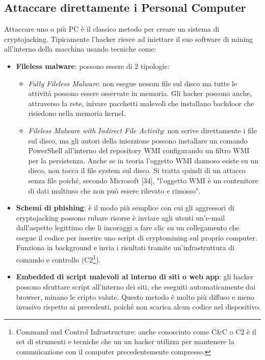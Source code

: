 \documentclass[12pt,a4paper]{article}
\begin{document}
\subsection{Attaccare direttamente i Personal Computer}
Attaccare uno o più PC è il classico metodo per creare un sistema di
cryptojacking. Tipicamente l'hacker riesce ad iniettare il suo software di
mining all'interno della macchina usando tecniche come:
\begin{itemize}
    \item \textbf{Fileless malware}: possono essere di 2 tipologie:
    \begin{itemize}
        \item \textit{Fully Fileless Malware}: non esegue nessun file sul disco
        ma tutte le attività possono essere osservate in memoria. Gli hacker
        possono anche, attraverso la rete, inivare pacchetti malevoli che
        installano backdoor che risiedono nella memoria kernel.
        \item \textit{Fileless Malware with Indirect File Activity}: non scrive
        direttamente i file sul disco, ma gli autori della iniezzione possono
        installare un comando PowerShell all'interno del repository WMI
        configurando un filtro WMI per la persistenza. Anche se in teoria
        l'oggetto WMI dannoso esiste su un disco, non tocca il file system sul
        disco. Si tratta quindi di un attacco senza file poiché, secondo
        Microsoft [34], "l'oggetto WMI è un contenitore di dati multiuso che non
        può essere rilevato e rimosso".\cite{FMW}
    \end{itemize}
    \item \textbf{Schemi di phishing}: è il modo più semplice con cui gli
        aggressori di cryptojacking possono rubare risorse è inviare agli utenti
        un'e-mail dall'aspetto legittimo che li incoraggi a fare clic su un
        collegamento che esegue il codice per inserire uno script di
        cryptomining sul proprio computer. Funziona in background e invia i
        risultati tramite un'infrastruttura di comando e controllo
        (C2\footnote{Command and Control Infrastructure: anche conosciuto come
        C\&C o C2 è il set di strumenti e tecniche che un un hacker utilizza per
        mantenere la commuicazione con il computer precedentemente compresso.}).
    \item \textbf{Embedded di script malevoli al interno di siti o web app}: gli
        hacker possono sfruttare script all'interno dei siti, che eseguiti
        automaticamente dai browser, minano le cripto valute. Questo metodo è
        molto più diffuso e meno invasivo rispetto ai precedenti, poiché non
        scarica alcun codice nel dispositivo.
\end{itemize}
\end{document}
